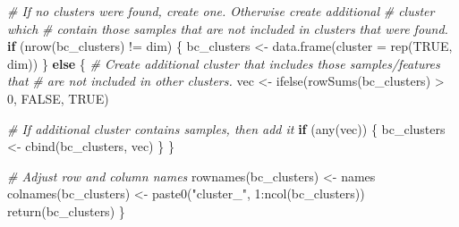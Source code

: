 \documentclass[
]{book}
\newenvironment{Shaded}{\begin{snugshade}}{\end{snugshade}}
\newcommand{\AttributeTok}[1]{\textcolor[rgb]{0.77,0.63,0.00}{#1}}
\newcommand{\CommentTok}[1]{\textcolor[rgb]{0.56,0.35,0.01}{\textit{#1}}}
\newcommand{\ConstantTok}[1]{\textcolor[rgb]{0.00,0.00,0.00}{#1}}
\newcommand{\ControlFlowTok}[1]{\textcolor[rgb]{0.13,0.29,0.53}{\textbf{#1}}}
\newcommand{\DecValTok}[1]{\textcolor[rgb]{0.00,0.00,0.81}{#1}}
\newcommand{\FunctionTok}[1]{\textcolor[rgb]{0.00,0.00,0.00}{#1}}
\newcommand{\NormalTok}[1]{#1}
\newcommand{\OtherTok}[1]{\textcolor[rgb]{0.56,0.35,0.01}{#1}}
\newcommand{\SpecialCharTok}[1]{\textcolor[rgb]{0.00,0.00,0.00}{#1}}
\newcommand{\StringTok}[1]{\textcolor[rgb]{0.31,0.60,0.02}{#1}}
\begin{document}
\begin{Shaded}
\begin{Highlighting}[]
    \CommentTok{\# If no clusters were found, create one. Otherwise create additional}
    \CommentTok{\# cluster which}
    \CommentTok{\# contain those samples that are not included in clusters that were found.}
    \ControlFlowTok{if}\NormalTok{ (}\FunctionTok{nrow}\NormalTok{(bc\_clusters) }\SpecialCharTok{!=}\NormalTok{ dim) \{}
\NormalTok{        bc\_clusters }\OtherTok{\textless{}{-}} \FunctionTok{data.frame}\NormalTok{(}\AttributeTok{cluster =} \FunctionTok{rep}\NormalTok{(}\ConstantTok{TRUE}\NormalTok{, dim))}
\NormalTok{    \} }\ControlFlowTok{else}\NormalTok{ \{}
        \CommentTok{\# Create additional cluster that includes those samples/features that}
        \CommentTok{\# are not included in other clusters.}
\NormalTok{        vec }\OtherTok{\textless{}{-}} \FunctionTok{ifelse}\NormalTok{(}\FunctionTok{rowSums}\NormalTok{(bc\_clusters) }\SpecialCharTok{\textgreater{}} \DecValTok{0}\NormalTok{, }\ConstantTok{FALSE}\NormalTok{, }\ConstantTok{TRUE}\NormalTok{)}

        \CommentTok{\# If additional cluster contains samples, then add it}
        \ControlFlowTok{if}\NormalTok{ (}\FunctionTok{any}\NormalTok{(vec)) \{}
\NormalTok{            bc\_clusters }\OtherTok{\textless{}{-}} \FunctionTok{cbind}\NormalTok{(bc\_clusters, vec)}
\NormalTok{        \}}
\NormalTok{    \}}
    
    \CommentTok{\# Adjust row and column names}
    \FunctionTok{rownames}\NormalTok{(bc\_clusters) }\OtherTok{\textless{}{-}}\NormalTok{ names}
    \FunctionTok{colnames}\NormalTok{(bc\_clusters) }\OtherTok{\textless{}{-}} \FunctionTok{paste0}\NormalTok{(}\StringTok{"cluster\_"}\NormalTok{, }\DecValTok{1}\SpecialCharTok{:}\FunctionTok{ncol}\NormalTok{(bc\_clusters))}
    \FunctionTok{return}\NormalTok{(bc\_clusters)}
\NormalTok{\}}
\end{Highlighting}
\end{Shaded}

\begin{Shaded}
\end{Shaded}
\end{document}

